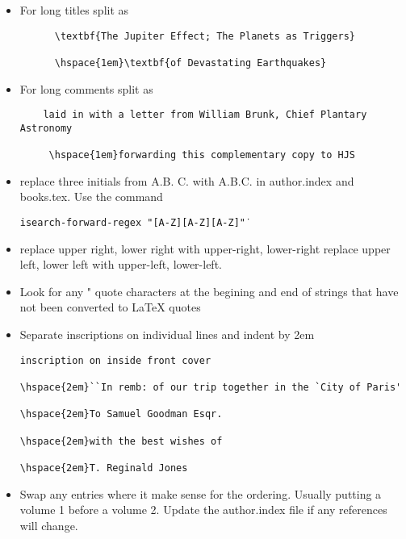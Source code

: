 \documentclass{article}
\begin{document}
\begin{itemize}
\item For long titles split as
\begin{verbatim}
      \textbf{The Jupiter Effect; The Planets as Triggers}
 
      \hspace{1em}\textbf{of Devastating Earthquakes}
\end{verbatim}

\item For long comments split as
\begin{verbatim}
    laid in with a letter from William Brunk, Chief Plantary Astronomy

     \hspace{1em}forwarding this complementary copy to HJS
\end{verbatim}

 \item replace three initials from A.B. C. with A.B.C.
   in author.index and books.tex.  Use the command
   
   \texttt{isearch-forward-regex "[A-Z]\.[A-Z]\. [A-Z]\."}

 \item replace upper right, lower right with upper-right, lower-right
   replace upper left, lower left with upper-left, lower-left.

 \item Look for any " quote characters at the begining and end of strings
       that have not been converted to LaTeX quotes

     \item Separate inscriptions on individual lines and indent by 2em
\begin{verbatim}
inscription on inside front cover

\hspace{2em}``In remb: of our trip together in the `City of Paris'

\hspace{2em}To Samuel Goodman Esqr.

\hspace{2em}with the best wishes of

\hspace{2em}T. Reginald Jones
\end{verbatim}

  \item Swap any entries where it make sense for the ordering. Usually
    putting a volume 1 before a volume 2.  Update the author.index
    file if any references will change.

\end{itemize}
\end{document}
